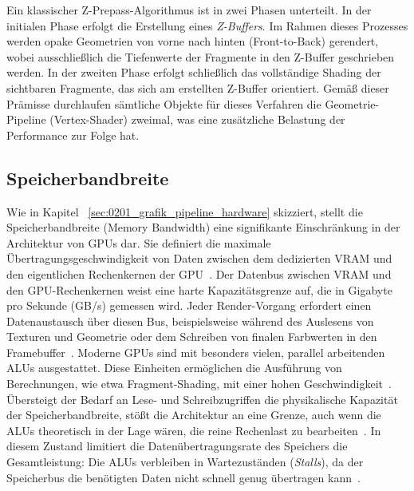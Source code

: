 Ein klassischer Z-Prepass-Algorithmus ist in zwei Phasen unterteilt.
In der initialen Phase erfolgt die Erstellung eines \textit{Z-Buffers}.
Im Rahmen dieses Prozesses werden opake Geometrien von vorne nach hinten (Front-to-Back) gerendert, wobei ausschließlich
die Tiefenwerte der Fragmente in den Z-Buffer geschrieben werden.
In der zweiten Phase erfolgt schließlich das vollständige Shading der sichtbaren Fragmente, das sich am erstellten
Z-Buffer orientiert.
\parencite[vgl.][Kap.~11.2, Abschn.~\textit{z-Prepass to the Rescue}]{gregoryGameEngineArchitecture2018}
Gemäß dieser Prämisse durchlaufen sämtliche Objekte für dieses Verfahren die Geometrie-Pipeline (Vertex-Shader) zweimal,
was eine zusätzliche Belastung der Performance zur Folge hat.

\subsection{Speicherbandbreite}
\label{subsec:020302_memory_bandwidth}

Wie in Kapitel ~\ref{sec:0201_grafik_pipeline_hardware} skizziert, stellt die Speicherbandbreite (Memory Bandwidth) eine
signifikante Einschränkung in der Architektur von \acp{GPU} dar.
Sie definiert die maximale Übertragungsgeschwindigkeit von Daten zwischen dem dedizierten \ac{VRAM} und den
eigentlichen Rechenkernen der \ac{GPU}~\parencite[vgl.][S.~30~u.~S.~791]{akenine-mollerRealtimeRendering2019}.
Der Datenbus zwischen \ac{VRAM} und den \ac{GPU}-Rechenkernen weist eine harte Kapazitätsgrenze auf, die in Gigabyte pro
Sekunde (GB/s) gemessen wird.
Jeder Render-Vorgang erfordert einen Datenaustausch über diesen Bus, beispielsweise während des Auslesens von Texturen
und Geometrie oder dem Schreiben von finalen Farbwerten in den
Framebuffer~\parencite[vgl.][S.~56]{burnsVisibilityBufferCacheFriendly2013}.
Moderne \acp{GPU} sind mit besonders vielen, parallel arbeitenden \acp{ALU} ausgestattet.
Diese Einheiten ermöglichen die Ausführung von Berechnungen, wie etwa Fragment-Shading, mit einer hohen
Geschwindigkeit~\parencite[vgl.][Kap.~23.2]{akenine-mollerRealtimeRendering2019}.
Übersteigt der Bedarf an Lese- und Schreibzugriffen die physikalische Kapazität der Speicherbandbreite, stößt die
Architektur an eine Grenze, auch wenn die \acp{ALU} theoretisch in der Lage wären, die reine Rechenlast zu
bearbeiten~\parencite[vgl.][S.~791]{akenine-mollerRealtimeRendering2019}.
In diesem Zustand limitiert die Datenübertragungsrate des Speichers die Gesamtleistung: Die \acp{ALU} verbleiben in
Wartezuständen (\textit{Stalls}), da der Speicherbus die benötigten Daten nicht schnell genug übertragen
kann~\parencite[vgl.][S.~31~u.~S.~791--792]{akenine-mollerRealtimeRendering2019}.

